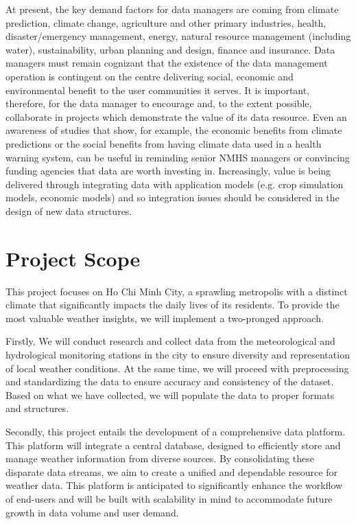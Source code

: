 At present, the key demand factors for data managers are coming from climate
prediction, climate change, agriculture and other primary industries, health,
disaster/emergency management, energy, natural resource management (including
water), sustainability, urban planning and design, finance and insurance. Data
managers must remain cognizant that the existence of the data management
operation is contingent on the centre delivering social, economic and
environmental benefit to the user communities it serves. It is important,
therefore, for the data manager to encourage and, to the extent possible,
collaborate in projects which demonstrate the value of its data resource. Even
an awareness of studies that show, for example, the economic benefits from
climate predictions or the social benefits from having climate data used in a
health warning system, can be useful in reminding senior NMHS managers or
convincing funding agencies that data are worth investing in. Increasingly,
value is being delivered through integrating data with application models (e.g.
crop simulation models, economic models) and so integration issues should be
considered in the design of new data structures.

\section{Project Scope}

This project focuses on Ho Chi Minh City, a sprawling metropolis with a distinct
climate that significantly impacts the daily lives of its residents. To provide
the most valuable weather insights, we will implement a two-pronged approach.

Firstly, We will conduct research and collect data from the meteorological and
hydrological monitoring stations in the city to ensure diversity and
representation of local weather conditions. At the same time, we will proceed
with preprocessing and standardizing the data to ensure accuracy and consistency
of the dataset. Based on what we have collected, we will populate the data to
proper formats and structures.

Secondly, this project entails the development of a comprehensive data platform.
This platform will integrate a central database, designed to efficiently store
and manage weather information from diverse sources. By consolidating these
disparate data streams, we aim to create a unified and dependable resource for
weather data. This platform is anticipated to significantly enhance the workflow
of end-users and will be built with scalability in mind to accommodate future
growth in data volume and user demand.


